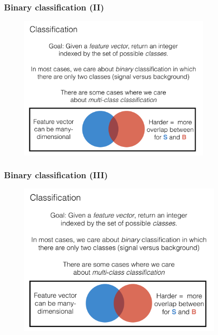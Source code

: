 \documentclass[hyperref={colorlinks=true}]{beamer}
\begin{document}
\begin{frame}%
  \frametitle{Binary classification (II)}

  \vspace{-0.0cm}

  \begin{figure}
    \centering 
    \includegraphics[width=0.85\textwidth,page=4]{ClassifierSlides.pdf}
  \end{figure}

    
\end{frame}


\begin{frame}%
  \frametitle{Binary classification (III)}

  \vspace{-0.0cm}

  \begin{figure}
    \centering 
    \includegraphics[width=0.9\textwidth,page=5]{ClassifierSlides.pdf}
  \end{figure}

    
\end{frame}
\end{document}
